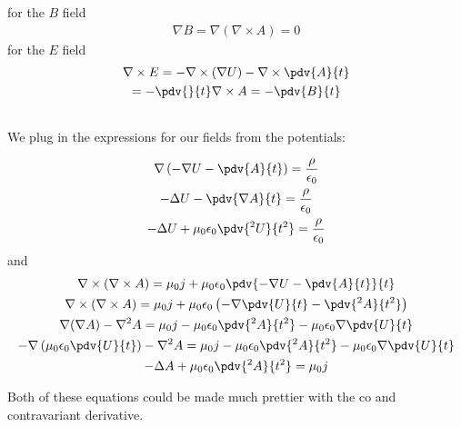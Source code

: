\documentclass[]{scrartcl}
\begin{document}
for the $B$ field
\begin{gather}
	\nabla B = \nabla (\nabla\times A) = 0
\end{gather}
for the $E$ field
\begin{gather}
	\nabla \times E = -\nabla\times (\nabla U) - \nabla \times \pdv{A}{t}\\
	= -\pdv{}{t}\nabla \times A = -\pdv{B}{t}
\end{gather}

\subsection{}

We plug in the expressions for our fields from the potentials:

\begin{gather*}
\nabla\left(-\nabla U - \pdv{A}{t}\right) =\frac{\rho}{\epsilon_0}\\
-\Delta U - \pdv{\nabla A}{t} = \frac{\rho}{\epsilon_0}\\
-\Delta U + \mu_0\epsilon_0\pdv{^2U}{t^2} = \frac{\rho}{\epsilon_0}
\end{gather*}
and
\begin{gather*}
	\nabla\times(\nabla\times A) = \mu_0 j + \mu_0\epsilon_0\pdv{-\nabla U - \pdv{A}{t}}{t}\\
	\nabla\times(\nabla\times A) = \mu_0 j + \mu_0\epsilon_0\left(-\nabla\pdv{U}{t} - \pdv{^2A}{t^2}\right)\\
\nabla(\nabla A) - \nabla^2 A = \mu_0j - \mu_0\epsilon_0\pdv{^2A}{t^2} -\mu_0\epsilon_0\nabla \pdv{U}{t}\\
	-\nabla\left(\mu_0\epsilon_0 \pdv{U}{t}\right) - \nabla^2 A = \mu_0j - \mu_0\epsilon_0\pdv{^2A}{t^2} -\mu_0\epsilon_0 \nabla\pdv{U}{t}\\
	-\Delta A + \mu_0\epsilon_0\pdv{^2A}{t^2} = \mu_0 j
\end{gather*}

Both of these equations could be made much prettier with the co and contravariant derivative.

\subsection{}
\end{document}
